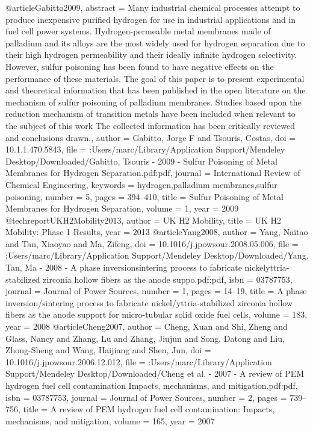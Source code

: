 @article{Gabitto2009,
abstract = {Many industrial chemical processes attempt to produce inexpensive purified hydrogen for use in industrial applications and in fuel cell power systems. Hydrogen-permeable metal membranes made of palladium and its alloys are the most widely used for hydrogen separation due to their high hydrogen permeability and their ideally infinite hydrogen selectivity. However, sulfur poisoning has been found to have negative effects on the performance of these materials. The goal of this paper is to present experimental and theoretical information that has been published in the open literature on the mechanism of sulfur poisoning of palladium membranes. Studies based upon the reduction mechanism of transition metals have been included when relevant to the subject of this work The collected information has been critically reviewed and conclusions drawn.},
author = {Gabitto, Jorge F and Tsouris, Costas},
doi = {10.1.1.470.5843},
file = {:Users/marc/Library/Application Support/Mendeley Desktop/Downloaded/Gabitto, Tsouris - 2009 - Sulfur Poisoning of Metal Membranes for Hydrogen Separation.pdf:pdf},
journal = {International Review of Chemical Engineering},
keywords = {hydrogen,palladium membranes,sulfur poisoning},
number = {5},
pages = {394--410},
title = {{Sulfur Poisoning of Metal Membranes for Hydrogen Separation}},
volume = {1},
year = {2009}
}
@techreport{UKH2Mobility2013,
author = {{UK H2 Mobility}},
title = {{UK H2 Mobility: Phase 1 Results}},
year = {2013}
}
@article{Yang2008,
author = {Yang, Naitao and Tan, Xiaoyao and Ma, Zifeng},
doi = {10.1016/j.jpowsour.2008.05.006},
file = {:Users/marc/Library/Application Support/Mendeley Desktop/Downloaded/Yang, Tan, Ma - 2008 - A phase inversionsintering process to fabricate nickelyttria-stabilized zirconia hollow fibers as the anode suppo.pdf:pdf},
isbn = {03787753},
journal = {Journal of Power Sources},
number = {1},
pages = {14--19},
title = {{A phase inversion/sintering process to fabricate nickel/yttria-stabilized zirconia hollow fibers as the anode support for micro-tubular solid oxide fuel cells}},
volume = {183},
year = {2008}
}
@article{Cheng2007,
author = {Cheng, Xuan and Shi, Zheng and Glass, Nancy and Zhang, Lu and Zhang, Jiujun and Song, Datong and Liu, Zhong-Sheng and Wang, Haijiang and Shen, Jun},
doi = {10.1016/j.jpowsour.2006.12.012},
file = {:Users/marc/Library/Application Support/Mendeley Desktop/Downloaded/Cheng et al. - 2007 - A review of PEM hydrogen fuel cell contamination Impacts, mechanisms, and mitigation.pdf:pdf},
isbn = {03787753},
journal = {Journal of Power Sources},
number = {2},
pages = {739--756},
title = {{A review of PEM hydrogen fuel cell contamination: Impacts, mechanisms, and mitigation}},
volume = {165},
year = {2007}
}
